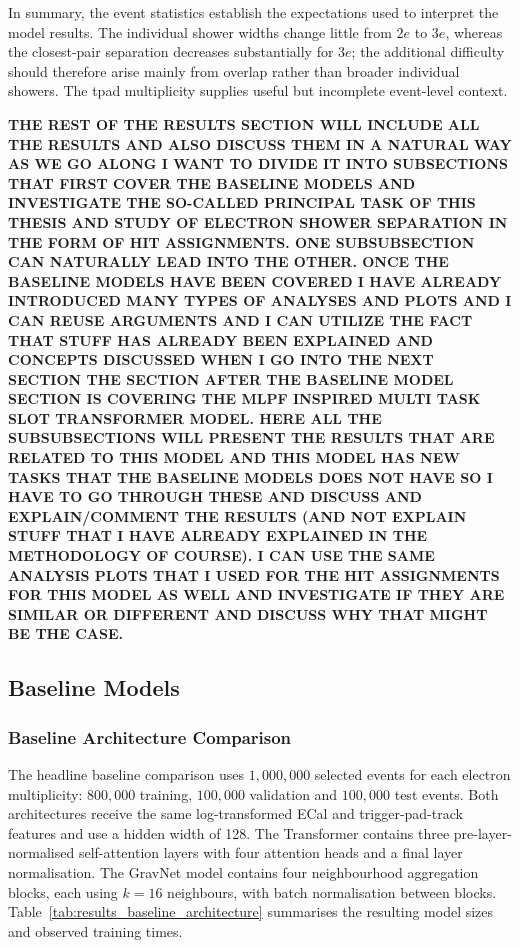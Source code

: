 \clearpage

In summary, the event statistics establish the expectations used to
interpret the model results. The individual shower widths change little from
\(2e\) to \(3e\), whereas the closest-pair separation decreases
substantially for \(3e\); the additional difficulty should therefore
arise mainly from overlap rather than broader individual showers. The
\gls{tpad} multiplicity supplies useful but incomplete event-level context.

\textbf{THE REST OF THE RESULTS SECTION WILL INCLUDE ALL THE RESULTS AND ALSO DISCUSS THEM IN A NATURAL WAY AS WE GO ALONG
I WANT TO DIVIDE IT INTO SUBSECTIONS THAT FIRST COVER THE BASELINE MODELS AND INVESTIGATE THE SO-CALLED PRINCIPAL TASK OF THIS THESIS AND STUDY OF ELECTRON SHOWER SEPARATION IN THE FORM OF HIT ASSIGNMENTS. ONE SUBSUBSECTION CAN NATURALLY LEAD INTO THE OTHER. 
ONCE THE BASELINE MODELS HAVE BEEN COVERED I HAVE ALREADY INTRODUCED MANY TYPES OF ANALYSES AND PLOTS AND I CAN REUSE ARGUMENTS AND I CAN UTILIZE THE FACT THAT STUFF HAS ALREADY BEEN EXPLAINED AND CONCEPTS DISCUSSED WHEN I GO INTO THE NEXT SECTION
THE SECTION AFTER THE BASELINE MODEL SECTION IS COVERING THE MLPF INSPIRED MULTI TASK SLOT TRANSFORMER MODEL. HERE ALL THE SUBSUBSECTIONS WILL PRESENT THE RESULTS THAT ARE RELATED TO THIS MODEL AND THIS MODEL HAS NEW TASKS THAT THE BASELINE MODELS DOES NOT HAVE SO I HAVE TO GO THROUGH THESE AND DISCUSS AND EXPLAIN/COMMENT THE RESULTS (AND NOT EXPLAIN STUFF THAT I HAVE ALREADY EXPLAINED IN THE METHODOLOGY OF COURSE). I CAN USE THE SAME ANALYSIS PLOTS THAT I USED FOR THE HIT ASSIGNMENTS FOR THIS MODEL AS WELL AND INVESTIGATE IF THEY ARE SIMILAR OR DIFFERENT AND DISCUSS WHY THAT MIGHT BE THE CASE.}


\clearpage
\subsection{Baseline Models}

\subsubsection{Baseline Architecture Comparison}

The headline baseline comparison uses \(1{,}000{,}000\) selected events for
each electron multiplicity: \(800{,}000\) training, \(100{,}000\) validation
and \(100{,}000\) test events.
Both architectures receive the same log-transformed ECal and trigger-pad-track
features and use a hidden width of 128. The Transformer contains three
pre-layer-normalised self-attention layers with four attention heads and a
final layer normalisation. The GravNet model contains four neighbourhood
aggregation blocks, each using \(k=16\) neighbours, with batch normalisation
between blocks. Table~\ref{tab:results_baseline_architecture} summarises the
resulting model sizes and observed training times.

